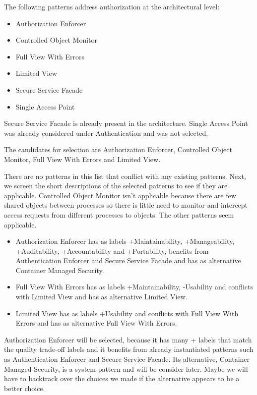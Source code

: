 \documentclass[a4paper,11pt]{report}
\begin{document}
The following patterns address authorization at the architectural level:
\begin{itemize}
\item Authorization Enforcer
\item Controlled Object Monitor
\item Full View With Errors
\item Limited View
\item Secure Service Facade
\item Single Access Point
\end{itemize}

Secure Service Facade is already present in the architecture. 
Single Access Point was already considered under Authentication and was not selected.

The candidates for selection are Authorization Enforcer, Controlled Object Monitor, Full View With Errors
and Limited View.

There are no patterns in this list that conflict with any existing patterns.
Next, we screen the short descriptions of the selected patterns to see if they are applicable. Controlled Object
Monitor isn't applicable because there are few shared objects between processes so there is little need to monitor
and intercept access requests from different processes to objects. The other patterns seem applicable.

\begin{itemize}
\item Authorization Enforcer has as labels +Maintainability, +Manageability, +Auditability, +Accountability and
+Portability, benefits from Authentication Enforcer and Secure Service Facade and has as alternative
Container Managed Security.

\item Full View With Errors has as labels +Maintainability, -Usability and conflicts with Limited View and has as
alternative Limited View.

\item Limited View has as labels +Usability and conflicts with Full View With Errors and has as alternative Full View 
With Errors.            
\end{itemize}

Authorization Enforcer will be selected, because it has many + labels that match the quality trade-off labels and
it benefits from already instantiated patterns such as Authentication Enforcer and Secure Service Facade. Its
alternative, Container Managed Security, is a system pattern and will be consider later. Maybe we will have to
backtrack over the choices we made if the alternative appears to be a better choice.
\end{document}
